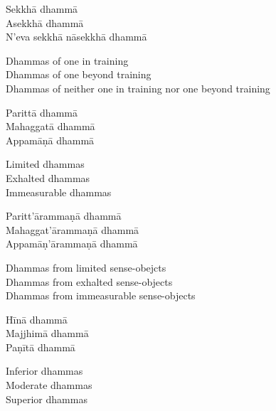\begin{pali-hang-continued}
Sekkhā dhammā\\
Asekkhā dhammā\\
N'eva sekkhā nāsekkhā dhammā
\end{pali-hang-continued}

\begin{english-verses}
  Dhammas of one in training\\
  Dhammas of one beyond training\\
  Dhammas of neither one in training nor one beyond training
\end{english-verses}

\begin{pali-hang-continued}
Parittā dhammā\\
Mahaggatā dhammā\\
Appamāṇā dhammā
\end{pali-hang-continued}

\begin{english-verses}
  Limited dhammas\\
  Exhalted dhammas\\
  Immeasurable dhammas
\end{english-verses}

\begin{pali-hang-continued}
Paritt'ārammaṇā dhammā\\
Mahaggat'ārammaṇā dhammā\\
Appamāṇ'ārammaṇā dhammā
\end{pali-hang-continued}

\begin{english-verses}
  Dhammas from limited sense-obejcts\\
  Dhammas from exhalted sense-objects\\
  Dhammas from immeasurable sense-objects
\end{english-verses}

\begin{pali-hang-continued}
Hīnā dhammā\\
Majjhimā dhammā\\
Paṇītā dhammā
\end{pali-hang-continued}

\begin{english-verses}
  Inferior dhammas\\
  Moderate dhammas\\
  Superior dhammas
\end{english-verses}

